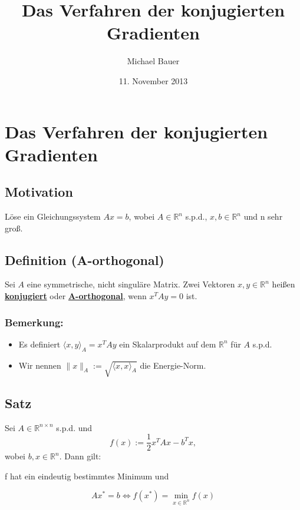 \documentclass{article}
\title{Das Verfahren der konjugierten Gradienten}
\author{Michael Bauer}
\date{11. November 2013}
\begin{document}
\maketitle
\tableofcontents
\newpage
\large

\section*{Das Verfahren der konjugierten Gradienten}

\subsection{Motivation}
Löse ein Gleichungssystem $Ax = b$, wobei $A\in\mathbb{R}^{n}$ s.p.d., $x, b\in\mathbb{R}^{n}$ und n sehr groß.

\subsection{Definition (A-orthogonal)}
Sei $A$ eine symmetrische, nicht singuläre Matrix. Zwei Vektoren $x,y \in \mathbb{R}^{n}$ heißen \underline{\textbf{konjugiert}} oder \underline{\textbf{A-orthogonal}}, wenn $x^{T}Ay = 0$ ist.

\subsubsection{Bemerkung:}
\begin{itemize}
\item Es definiert $\langle x,y \rangle _{A} = x^{T}Ay$ ein Skalarprodukt auf dem $\mathbb{R}^{n}$ für $A$ s.p.d.
\item Wir nennen $\|x\|_{A} := \sqrt{\langle x, x \rangle _{A}}$ die Energie-Norm.
\end{itemize}

\subsection{Satz}
Sei $A\in\mathbb{R}^{n \times n}$ s.p.d. und
\begin{equation}
f(x) := \frac 1 2 x^{T}Ax - b^{T}x,
\end{equation}
wobei $b,x \in \mathbb{R}^{n}$. Dann gilt:
\begin{center}
f hat ein eindeutig bestimmtes Minimum und
\end{center}
\begin{equation}
Ax^{*} = b \Longleftrightarrow f(x^{*}) = \underset{x\in\mathbb{R}^{n}}{\min} f(x)
\end{equation}
\end{document}
